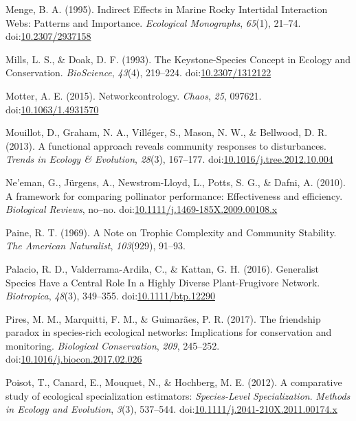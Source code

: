 \documentclass[a4paper]{artikel1}
\theoremstyle{definition}
\theoremstyle{definition}
\theoremstyle{definition}
\theoremstyle{remark}
\begin{document}
\hypertarget{ref-menge_indirect_1995}{}
Menge, B. A. (1995). Indirect Effects in Marine Rocky Intertidal
Interaction Webs: Patterns and Importance. \emph{Ecological Monographs},
\emph{65}(1), 21--74.
doi:\href{https://doi.org/10.2307/2937158}{10.2307/2937158}

\hypertarget{ref-mills_keystone-species_1993}{}
Mills, L. S., \& Doak, D. F. (1993). The Keystone-Species Concept in
Ecology and Conservation. \emph{BioScience}, \emph{43}(4), 219--224.
doi:\href{https://doi.org/10.2307/1312122}{10.2307/1312122}

\hypertarget{ref-motter_networkcontrology_2015}{}
Motter, A. E. (2015). Networkcontrology. \emph{Chaos}, \emph{25},
097621. doi:\href{https://doi.org/10.1063/1.4931570}{10.1063/1.4931570}

\hypertarget{ref-mouillot_functional_2013}{}
Mouillot, D., Graham, N. A., Villéger, S., Mason, N. W., \& Bellwood, D.
R. (2013). A functional approach reveals community responses to
disturbances. \emph{Trends in Ecology \& Evolution}, \emph{28}(3),
167--177.
doi:\href{https://doi.org/10.1016/j.tree.2012.10.004}{10.1016/j.tree.2012.10.004}

\hypertarget{ref-neeman_framework_2010}{}
Ne'eman, G., Jürgens, A., Newstrom-Lloyd, L., Potts, S. G., \& Dafni, A.
(2010). A framework for comparing pollinator performance: Effectiveness
and efficiency. \emph{Biological Reviews}, no--no.
doi:\href{https://doi.org/10.1111/j.1469-185X.2009.00108.x}{10.1111/j.1469-185X.2009.00108.x}

\hypertarget{ref-paine_note_1969}{}
Paine, R. T. (1969). A Note on Trophic Complexity and Community
Stability. \emph{The American Naturalist}, \emph{103}(929), 91--93.

\hypertarget{ref-palacio_generalist_2016}{}
Palacio, R. D., Valderrama-Ardila, C., \& Kattan, G. H. (2016).
Generalist Species Have a Central Role In a Highly Diverse
Plant-Frugivore Network. \emph{Biotropica}, \emph{48}(3), 349--355.
doi:\href{https://doi.org/10.1111/btp.12290}{10.1111/btp.12290}

\hypertarget{ref-pires_friendship_2017}{}
Pires, M. M., Marquitti, F. M., \& Guimarães, P. R. (2017). The
friendship paradox in species-rich ecological networks: Implications for
conservation and monitoring. \emph{Biological Conservation}, \emph{209},
245--252.
doi:\href{https://doi.org/10.1016/j.biocon.2017.02.026}{10.1016/j.biocon.2017.02.026}

\hypertarget{ref-poisot_comparative_2012}{}
Poisot, T., Canard, E., Mouquet, N., \& Hochberg, M. E. (2012). A
comparative study of ecological specialization estimators:
\emph{Species}\emph{-Level Specialization}. \emph{Methods in Ecology and
Evolution}, \emph{3}(3), 537--544.
doi:\href{https://doi.org/10.1111/j.2041-210X.2011.00174.x}{10.1111/j.2041-210X.2011.00174.x}
\end{document}
